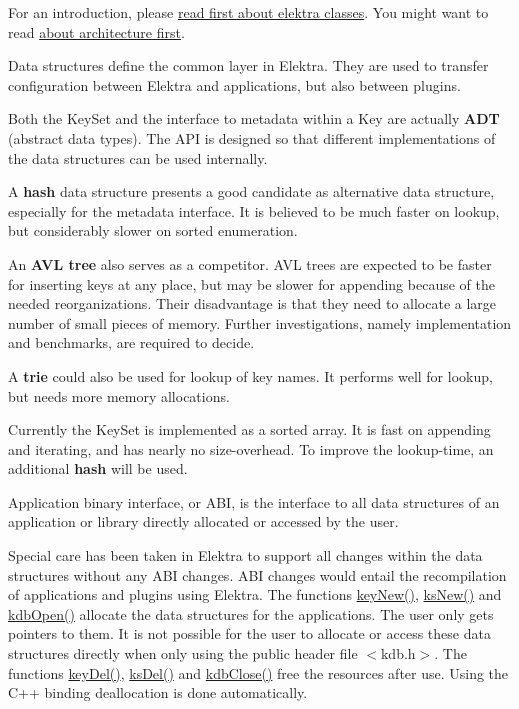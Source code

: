 For an introduction, please \hyperlink{doc_dev_classes_md}{read first about elektra classes}. You might want to read \hyperlink{doc_dev_architecture_md}{about architecture first}.

Data structures define the common layer in Elektra. They are used to transfer configuration between Elektra and applications, but also between plugins.

Both the {\ttfamily Key\+Set} and the interface to metadata within a {\ttfamily Key} are actually {\bfseries A\+DT} (abstract data types). The A\+PI is designed so that different implementations of the data structures can be used internally.

A {\bfseries hash} data structure presents a good candidate as alternative data structure, especially for the metadata interface. It is believed to be much faster on lookup, but considerably slower on sorted enumeration.

An {\bfseries A\+VL tree} also serves as a competitor. A\+VL trees are expected to be faster for inserting keys at any place, but may be slower for appending because of the needed reorganizations. Their disadvantage is that they need to allocate a large number of small pieces of memory. Further investigations, namely implementation and benchmarks, are required to decide.

A {\bfseries trie} could also be used for lookup of key names. It performs well for lookup, but needs more memory allocations.

Currently the {\ttfamily Key\+Set} is implemented as a sorted array. It is fast on appending and iterating, and has nearly no size-\/overhead. To improve the lookup-\/time, an additional {\bfseries hash} will be used.

Application binary interface, or A\+BI, is the interface to all data structures of an application or library directly allocated or accessed by the user.

Special care has been taken in Elektra to support all changes within the data structures without any A\+BI changes. A\+BI changes would entail the recompilation of applications and plugins using Elektra. The functions {\ttfamily \hyperlink{group__key_gad23c65b44bf48d773759e1f9a4d43b89}{key\+New()}}, {\ttfamily \hyperlink{group__keyset_ga671e1aaee3ae9dc13b4834a4ddbd2c3c}{ks\+New()}} and {\ttfamily \hyperlink{group__kdb_ga6808defe5870f328dd17910aacbdc6ca}{kdb\+Open()}} allocate the data structures for the applications. The user only gets pointers to them. It is not possible for the user to allocate or access these data structures directly when only using the public header file {\ttfamily $<$kdb.\+h$>$}. The functions {\ttfamily \hyperlink{group__key_ga3df95bbc2494e3e6703ece5639be5bb1}{key\+Del()}}, {\ttfamily \hyperlink{group__keyset_ga27e5c16473b02a422238c8d970db7ac8}{ks\+Del()}} and {\ttfamily \hyperlink{group__kdb_gadb54dc9fda17ee07deb9444df745c96f}{kdb\+Close()}} free the resources after use. Using the C++ binding deallocation is done automatically.

